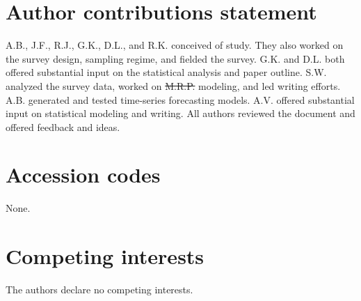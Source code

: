 \documentclass[fleqn,10pt]{wlscirep}
\providecommand{\DIFadd}[1]{{\protect\color{blue}\uwave{#1}}} %
\providecommand{\DIFdel}[1]{{\protect\color{red}\sout{#1}}}                      %
\providecommand{\DIFaddbegin}{} %
\providecommand{\DIFaddend}{} %
\providecommand{\DIFdelbegin}{} %
\providecommand{\DIFdelend}{} %
\begin{document}
\section*{Author contributions statement}

A.B., J.F., R.J., G.K., D.L., and R.K. conceived of study. They also worked on the survey design, sampling regime, and fielded the survey. G.K. and D.L. both offered substantial input on the statistical analysis and paper outline. S.W. analyzed the survey data, worked on \DIFdelbegin \DIFdel{M.R.P. }\DIFdelend \DIFaddbegin \DIFadd{MRP }\DIFaddend modeling, and led writing efforts. A.B. generated and tested time-series forecasting models. A.V. offered substantial input on statistical modeling and writing. All authors reviewed the document and offered feedback and ideas. 

\section*{Accession codes}
None.

\section*{Competing interests}

The authors declare no competing interests. 
\end{document}
